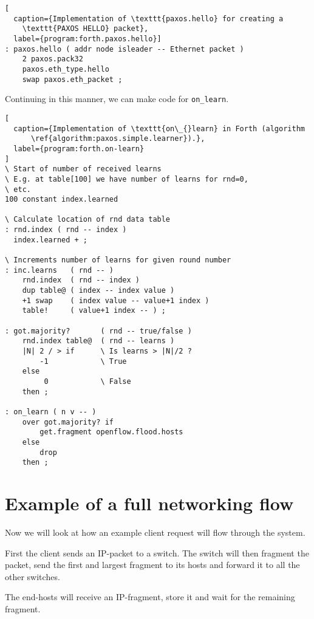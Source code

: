 \begin{lstlisting}[
  caption={Implementation of \texttt{paxos.hello} for creating a
    \texttt{PAXOS HELLO} packet},
  label={program:forth.paxos.hello}]
: paxos.hello ( addr node isleader -- Ethernet packet )
    2 paxos.pack32
    paxos.eth_type.hello
    swap paxos.eth_packet ;
\end{lstlisting}

Continuing in this manner, we can make code for \texttt{on\_{}learn}.

\begin{lstlisting}[
  caption={Implementation of \texttt{on\_{}learn} in Forth (algorithm
      \ref{algorithm:paxos.simple.learner}).},
  label={program:forth.on-learn}
]
\ Start of number of received learns
\ E.g. at table[100] we have number of learns for rnd=0,
\ etc.
100 constant index.learned

\ Calculate location of rnd data table
: rnd.index ( rnd -- index )
  index.learned + ;

\ Increments number of learns for given round number
: inc.learns   ( rnd -- )
    rnd.index  ( rnd -- index )
    dup table@ ( index -- index value )
    +1 swap    ( index value -- value+1 index )
    table!     ( value+1 index -- ) ;

: got.majority?       ( rnd -- true/false )
    rnd.index table@  ( rnd -- learns )
    |N| 2 / > if      \ Is learns > |N|/2 ?
        -1            \ True
    else
         0            \ False
    then ;

: on_learn ( n v -- )
    over got.majority? if
        get.fragment openflow.flood.hosts
    else
        drop
    then ;
\end{lstlisting}

\section{Example of a full networking flow}

Now we will look at how an example client request will flow through the
system.

First the client sends an IP-packet to a switch.
The switch will then fragment the packet, send the first and largest
fragment to its hosts and forward it to all the other switches.

The end-hosts will receive an IP-fragment, store it and wait for the
remaining fragment.

